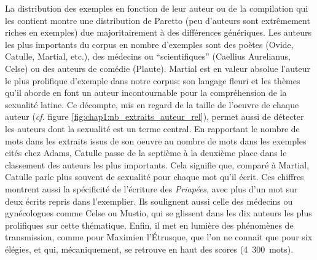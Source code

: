 La distribution des exemples en fonction de leur auteur ou de la compilation qui les contient montre une distribution de Paretto (peu d'auteurs sont extrêmement riches en exemples) due majoritairement à des différences génériques. Les auteurs les plus importants du corpus en nombre d'exemples sont des poètes (Ovide, Catulle, Martial, etc.), des médecins ou \enquote{scientifiques} (Caellius Aurelianus, Celse) ou des auteurs de comédie (Plaute). Martial est en valeur absolue l'auteur le plus prolifique d'exemple dans notre corpus: son langage fleuri et les thèmes qu'il aborde en font un auteur incontournable pour la compréhension de la sexualité latine. Ce décompte, mis en regard de la taille de l'oeuvre de chaque auteur (\textit{cf.} figure \ref{fig:chap1:nb_extraits_auteur_rel}), permet aussi de détecter les auteurs dont la sexualité est un terme central. En rapportant le nombre de mots dans les extraits issus de son oeuvre au nombre de mots dans les exemples cités chez Adams, Catulle passe de la septième à la deuxième place dans le classement des auteurs les plus importants. Cela signifie que, comparé à Martial, Catulle parle plus souvent de sexualité pour chaque mot qu'il écrit. Ces chiffres montrent aussi la spécificité de l'écriture des \textit{Priapées}, avec plus d'un mot sur deux écrits repris dans l'exemplier. Ils soulignent aussi celle des médecins ou gynécologues comme Celse ou Mustio, qui se glissent dans les dix auteurs les plus prolifiques sur cette thématique. Enfin, il met en lumière des phénomènes de transmission, comme pour Maximien l'Étrusque, que l'on ne connait que pour six élégies, et qui, mécaniquement, se retrouve en haut des scores (4~300~mots).

